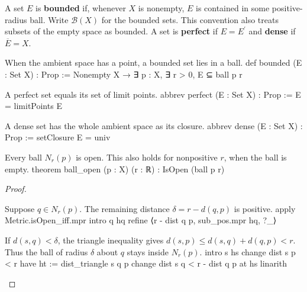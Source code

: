 \begin{definition} \label{an1:def:bounded-perfect-dense-sets}
  A set $E$ is \textbf{bounded} if, whenever $X$ is nonempty, $E$ is contained in some positive-radius ball.
  Write $\mathcal B(X)$ for the bounded sets. This convention also treats subsets of the empty space as bounded.
  A set is \textbf{perfect} if $E=E^{\prime}$ and \textbf{dense} if $\overline E=X$.
  \begin{lean}{When the ambient space has a point, a bounded set lies in a ball.}
    def bounded (E : Set X) : Prop :=
      Nonempty X → ∃ p : X, ∃ r > 0, E ⊆ ball p r
  \end{lean}
  \begin{lean}{A perfect set equals its set of limit points.}
    abbrev perfect (E : Set X) : Prop := E = limitPoints E
  \end{lean}
  \begin{lean}{A dense set has the whole ambient space as its closure.}
    abbrev dense (E : Set X) : Prop := setClosure E = univ
  \end{lean}
\end{definition}

\begin{proposition} \label{an1:thm:neighborhood-is-open}
  \begin{lean}{Every ball $N_r(p)$ is open. This also holds for nonpositive $r$, when the ball is empty.}
    theorem ball_open (p : X) (r : ℝ) : IsOpen (ball p r)
  \end{lean}
\end{proposition}

\begin{proof}
  \begin{lean}{Suppose $q\in N_r(p)$. The remaining distance $\delta=r-d(q,p)$ is positive.}
    apply Metric.isOpen_iff.mpr
    intro q hq
    refine ⟨r - dist q p, sub_pos.mpr hq, ?_⟩
  \end{lean}

  \begin{lean}{If $d(s,q)<\delta$, the triangle inequality gives $d(s,p)\leq d(s,q)+d(q,p)<r$. Thus the ball of radius $\delta$ about $q$ stays inside $N_r(p)$.}
    intro s hs
    change dist s p < r
    have ht := dist_triangle s q p
    change dist s q < r - dist q p at hs
    linarith
  \end{lean}

\end{proof}

